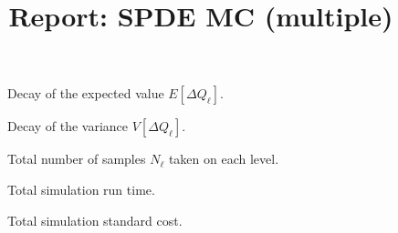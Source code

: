 \documentclass[11pt, oneside]{article}
\title{Report: SPDE MC (multiple)}
\date{}
\newlength\figureheight
\newlength\figurewidth
\begin{document}
\maketitle

\begin{figure}[h]
\centering
\setlength{\figureheight}{0.3\textwidth}
\setlength{\figurewidth}{0.3\textwidth}

 \caption{\label{fig:E}Decay of the expected value $E[\Delta Q_\ell]$.}
\end{figure}


\begin{figure}[h]
\centering
\setlength{\figureheight}{0.3\textwidth}
\setlength{\figurewidth}{0.3\textwidth}

 \caption{\label{fig:V}Decay of the variance $V[\Delta Q_\ell]$.}
\end{figure}


\begin{figure}[h]
\centering
\setlength{\figureheight}{0.3\textwidth}
\setlength{\figurewidth}{0.3\textwidth}

 \caption{\label{fig:samples}Total number of samples $N_\ell$ taken on each level.}
\end{figure}


\begin{figure}[h]
\centering
\setlength{\figureheight}{0.3\textwidth}
\setlength{\figurewidth}{0.3\textwidth}

 \caption{\label{fig:time}Total simulation run time.}
\end{figure}


\begin{figure}[h]
\centering
\setlength{\figureheight}{0.3\textwidth}
\setlength{\figurewidth}{0.3\textwidth}

 \caption{\label{fig:cost}Total simulation standard cost.}
\end{figure}
\end{document}
